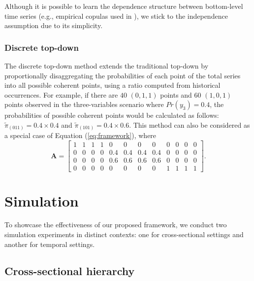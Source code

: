 \documentclass[a4paper,review,12pt,authoryear]{elsarticle}
\begin{document}
    Although it is possible to learn the dependence structure between bottom-level time series (e.g., empirical copulas used in \citealp{bentaiebHierarchicalProbabilisticForecasting2020}), we stick to the independence assumption due to its simplicity.

    \subsubsection*{\textbf{Discrete top-down}}

    The discrete top-down method extends the traditional top-down by proportionally disaggregating the probabilities of each point of the total series into all possible coherent points, using a ratio computed from historical occurrences.
    For example, if there are $40$ $(0, 1, 1)$ points and $60$ $(1, 0, 1) $ points observed in the three-variables scenario where $Pr(y_3) = 0.4$, the probabilities of possible coherent points would be calculated as follows: $\tilde \pi_{(011)} = 0.4\times 0.4$ and $\tilde \pi_{(101)} = 0.4\times 0.6$.
    This method can also be considered as a special case of Equation (\ref{eq:framework}), where
    \[
    \mathbf{A} = \left[\begin{matrix}
      1 & 1 & 1 & 1 & 0 & 0 & 0 & 0 & 0 & 0 & 0 & 0 \\
      0 & 0 & 0 & 0 & 0.4 & 0.4 & 0.4 & 0.4 & 0 & 0 & 0 & 0 \\      
      0 & 0 & 0 & 0 & 0.6 & 0.6 & 0.6 & 0.6 & 0 & 0 & 0 & 0 \\
      0 & 0 & 0 & 0 & 0 & 0 & 0 & 0 & 1 & 1 & 1 & 1  
    \end{matrix}\right].
    \]

\section{Simulation}
\label{sec:simulation}

To showcase the effectiveness of our proposed framework, we conduct two simulation experiments in distinct contexts: one for cross-sectional settings and another for temporal settings. 
     
  \subsection{Cross-sectional hierarchy}
  \label{sec:cross-sectional_simu}
\end{document}
